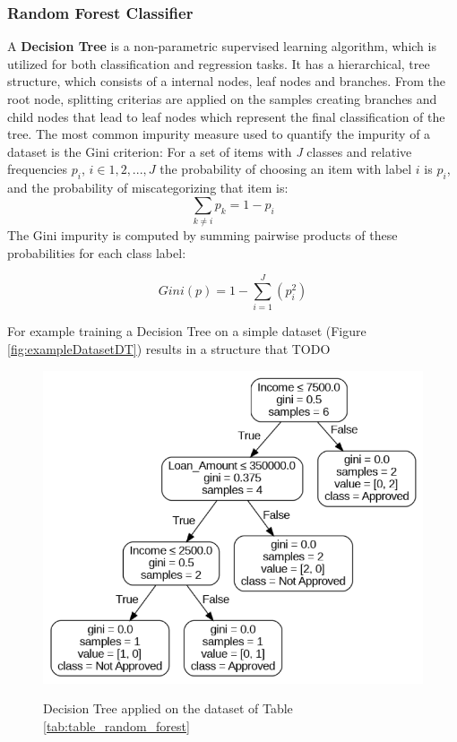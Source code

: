 \subsubsection{Random Forest Classifier}
A \textbf{Decision Tree} is a non-parametric supervised learning algorithm, which is utilized for both classification and regression tasks. 
It has a hierarchical, tree structure, which consists of a internal nodes, leaf nodes and branches.
From the root node, splitting criterias are applied on the samples creating branches and child nodes that lead to leaf nodes which represent the final classification of the tree.
The most common impurity measure used to quantify the impurity of a dataset is the Gini criterion:
For a set of items with \textit{J} classes and relative frequencies $p_{i}$, $i \in {1,2,...,J}$ 
the probability of choosing an item with label $i$ is $p_{i}$, and the probability of miscategorizing that item is:
\begin{equation} 
  \sum_{k \ne i} p_{k} = 1 - p_{i} 
\end{equation}
The Gini impurity is computed by summing pairwise products of these probabilities for each class label:
\begin{center}
  \begin{equation}
    Gini(p) = 1 - \sum_{i=1}^{J} (p_i^2)
  \end{equation}
\end{center}
For example training a Decision Tree on a simple dataset (Figure \ref{fig:exampleDatasetDT}) results in a structure that TODO

\begin{figure}[H]
  \centering
  \includegraphics[width=0.7\linewidth]{graphics/DecTree.png}
  \label{fig:knn5}
  \caption{Decision Tree applied on the dataset of Table \ref{tab:table_random_forest}}
\end{figure}


